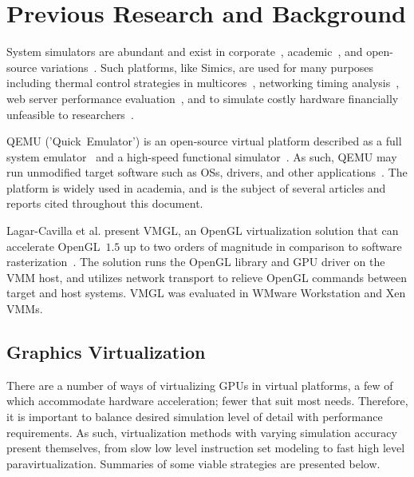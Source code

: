
\section{Previous Research and Background}
\label{sec:previousresearch}
System simulators are abundant and exist in corporate~, academic~, and open-source variations~.
Such platforms, like Simics, are used for many purposes including thermal control strategies in multicores~, networking timing analysis~, web server performance evaluation~, and to simulate costly hardware financially unfeasible to researchers~.

QEMU ('Quick~Emulator') is an open-source virtual platform described as a full system emulator~ and a high-speed functional simulator~.
As such, QEMU may run unmodified target software such as OSs, drivers, and other applications~.
The platform is widely used in academia, and is the subject of several articles and reports cited throughout this document.

Lagar-Cavilla et al. present VMGL, an OpenGL virtualization solution that can accelerate OpenGL~$1.5$ up to two orders of magnitude in comparison to software rasterization~.
The solution runs the OpenGL library and GPU driver on the VMM host, and utilizes network transport to relieve OpenGL commands between target and host systems.
VMGL was evaluated in WMware Workstation and Xen VMMs.

\subsection{Graphics Virtualization}
\label{sec:previousresearch_graphicsvirtualization}
There are a number of ways of virtualizing GPUs in virtual platforms, a few of which accommodate hardware acceleration; fewer that suit most needs.
Therefore, it is important to balance desired simulation level of detail with performance requirements.
As such, virtualization methods with varying simulation accuracy present themselves, from slow low level instruction set modeling to fast high level paravirtualization.
Summaries of some viable strategies are presented below.

